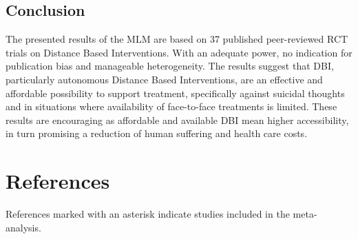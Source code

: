 \documentclass[
  english,
  man]{apa6}
\begin{document}
\hypertarget{conclusion}{%
\subsection{Conclusion}\label{conclusion}}

The presented results of the MLM are based on 37 published peer-reviewed RCT trials on Distance Based Interventions. With an adequate power, no indication for publication bias and manageable heterogeneity. The results suggest that DBI, particularly autonomous Distance Based Interventions, are an effective and affordable possibility to support treatment, specifically against suicidal thoughts and in situations where availability of face-to-face treatments is limited. These results are encouraging as affordable and available DBI mean higher accessibility, in turn promising a reduction of human suffering and health care costs.

\hypertarget{references}{%
\section{References}\label{references}}

\begingroup
\setlength{\parindent}{-0.5in}
\setlength{\leftskip}{0.5in}

References marked with an asterisk indicate studies included in the meta-analysis.
\end{document}
